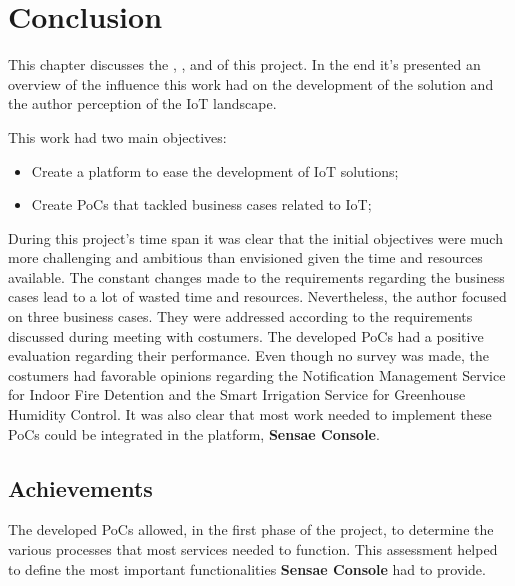 \chapter{Conclusion}
\label{chap:conclusion}

This chapter discusses the , , and  of this project.
In the end it's presented an overview of the influence this work had on the development of the solution and the author perception of the \gls{IoT} landscape.

This work had two main objectives:

\begin{itemize}
    \item Create a platform to ease the development of \gls{IoT} solutions;
    \item Create \gls{PoC}s that tackled business cases related to \gls{IoT};
\end{itemize}

During this project's time span it was clear that the initial objectives were much more challenging and ambitious than envisioned given the time and resources available. The constant changes made to the requirements regarding the business cases lead to a lot of wasted time and resources. Nevertheless, the author focused on three business cases. They were addressed according to the requirements discussed during meeting with costumers. The developed \gls{PoC}s had a positive evaluation regarding their performance. Even though no survey was made, the costumers had favorable opinions regarding the Notification Management Service for Indoor Fire Detention and the Smart Irrigation Service for Greenhouse Humidity Control. It was also clear that most work needed to implement these \gls{PoC}s could be integrated in the platform, \textbf{Sensae Console}.

\section{Achievements}
\label{sec:conclusion:achivements}

The developed \gls{PoC}s allowed, in the first phase of the project, to determine the various processes that most services needed to function. This assessment helped to define the most important functionalities \textbf{Sensae Console} had to provide.


